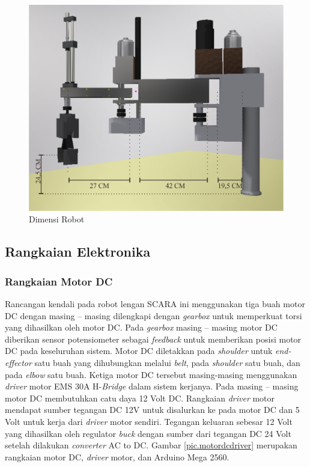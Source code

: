 \begin{figure}[H]
	\centering
	\includegraphics[height=9 cm]{gambar/scaradimensi.png}
	\caption{Dimensi Robot}
	\label{pic.scaradimensi}
\end{figure}

\subsection{Rangkaian Elektronika}
\subsubsection{Rangkaian Motor DC}
Rancangan kendali pada robot lengan SCARA ini menggunakan tiga buah motor DC dengan masing – masing dilengkapi dengan \textit{gearbox} untuk memperkuat torsi yang dihasilkan oleh motor DC. Pada  \textit{gearbox} masing – masing motor  DC diberikan sensor potensiometer sebagai \textit{feedback} untuk memberikan posisi motor DC pada keseluruhan sistem. Motor DC diletakkan pada \textit{shoulder} untuk \textit{end-effector} satu buah yang dihubungkan melalui \textit{belt}, pada \textit{shoulder} satu buah, dan pada \textit{elbow} satu buah. Ketiga motor DC tersebut masing-masing menggunakan \textit{driver} motor EMS 30A H-\textit{Bridge} dalam sistem kerjanya. Pada masing – masing motor DC membutuhkan catu daya 12 Volt DC. Rangkaian \textit{driver} motor mendapat sumber tegangan DC 12V untuk disalurkan ke pada motor DC dan 5 Volt untuk kerja dari \textit{driver} motor sendiri. Tegangan keluaran sebesar 12 Volt yang dihasilkan oleh regulator \textit{buck} dengan sumber dari tegangan DC 24 Volt setelah dilakukan \textit{converter} AC to DC. Gambar \ref{pic.motordcdriver} merupakan rangkaian motor DC, \textit{driver} motor, dan Arduino Mega 2560.  


